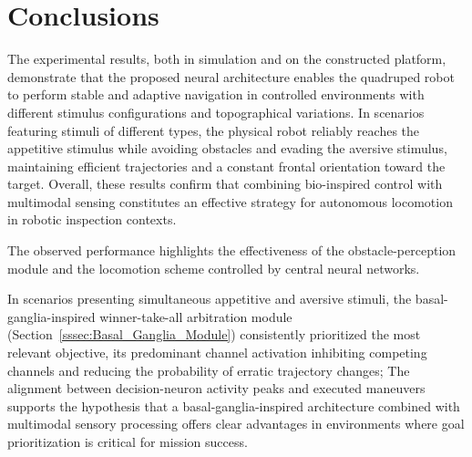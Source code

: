 \section{Conclusions}
\label{sec:conclusions}

The experimental results, both in simulation and on the constructed platform, demonstrate that the proposed neural architecture enables the quadruped robot to perform stable and adaptive navigation in controlled environments with different stimulus configurations and topographical variations. In scenarios featuring stimuli of different types, the physical robot reliably reaches the appetitive stimulus while avoiding obstacles and evading the aversive stimulus, maintaining efficient trajectories and a constant frontal orientation toward the target. Overall, these results confirm that combining bio-inspired control with multimodal sensing constitutes an effective strategy for autonomous locomotion in robotic inspection contexts. 

The observed performance highlights the effectiveness of the obstacle-perception module and the locomotion scheme controlled by central neural networks.  

In scenarios presenting simultaneous appetitive and aversive stimuli, the basal-ganglia-inspired winner-take-all arbitration module (Section~\ref{sssec:Basal_Ganglia_Module}) consistently prioritized the most relevant objective, its predominant channel activation inhibiting competing channels and reducing the probability of erratic trajectory changes;  The alignment between decision-neuron activity peaks and executed maneuvers supports the hypothesis that a basal-ganglia-inspired architecture combined with multimodal sensory processing offers clear advantages in environments where goal prioritization is critical for mission success. 

